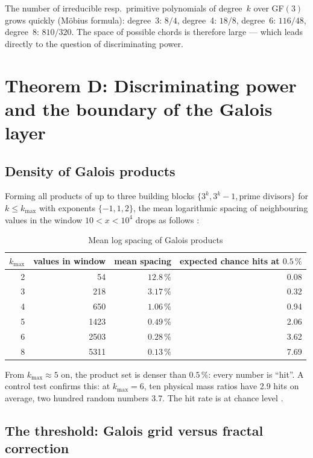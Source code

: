 The number of irreducible resp.\ primitive polynomials of degree~$k$ over GF$(3)$
grows quickly (Möbius formula): degree~3: $8/4$, degree~4: $18/8$, degree~6:
$116/48$, degree~8: $810/320$. The space of possible chords is therefore large ---
which leads directly to the question of discriminating power.

\section{Theorem D: Discriminating power and the boundary of the Galois layer}

\subsection{Density of Galois products}

Forming all products of up to three building blocks
$\{3^k, 3^k - 1, \text{prime divisors}\}$ for $k \leq k_\text{max}$ with exponents
$\{-1, 1, 2\}$, the mean logarithmic spacing of neighbouring values in the window
$10 < x < 10^4$ drops as follows \BM:

\begin{table}[H]
\centering
\caption{Mean log spacing of Galois products}
\begin{tabular}{rrrr}
\toprule
$k_\text{max}$ & values in window & mean spacing & expected chance hits at $0.5\,\%$ \\
\midrule
2 & 54 & $12.8\,\%$ & 0.08 \\
3 & 218 & $3.17\,\%$ & 0.32 \\
4 & 650 & $1.06\,\%$ & 0.94 \\
5 & 1423 & $0.49\,\%$ & 2.06 \\
6 & 2503 & $0.28\,\%$ & 3.62 \\
8 & 5311 & $0.13\,\%$ & 7.69 \\
\bottomrule
\end{tabular}
\end{table}

From $k_\text{max} \approx 5$ on, the product set is denser than $0.5\,\%$: every
number is ``hit''. A control test confirms this: at $k_\text{max} = 6$, ten physical
mass ratios have 2.9 hits on average, two hundred random numbers 3.7. The hit rate
is at chance level \BM.

\subsection{The threshold: Galois grid versus fractal correction}

